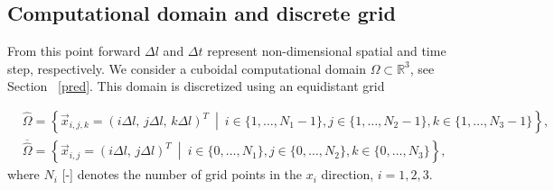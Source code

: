 \subsection{Computational domain and discrete grid}
From this point forward $ \Delta l $ and $ \Delta t $ represent non-dimensional spatial and time step, respectively. We consider a cuboidal computational domain $ \Omega \subset \mathbb{R}^3 $, see Section~ \ref{pred}. This domain is discretized using an equidistant grid

\begin{subequations}\label{eq:domain}
	\begin{eqnarray}
		&\hat{\Omega} = \left\{ \vec{x}_{i,j,k} = (i \Delta l,\,j \Delta l, \,k \Delta l)^T \ \middle| \ i \in \{1, \dots, N_{1} - 1\}, j \in \{1, \dots, N_{2} - 1 \}, k \in \{1, \dots, N_{3} - 1 \} \right\},\\[4pt]
		&\overline{\hat{\Omega}} = \left\{ \vec{x}_{i,j} = (i \Delta l,\,j \Delta l)^T \ \middle| \ i \in \{0, \dots, N_{1} \}, j \in \{0, \dots, N_{2} \}, k \in \{0, \dots, N_{3} \} \right\},
	\end{eqnarray}
\end{subequations}
where $ N_{i} $ [-] denotes the number of grid points in the $ x_i $ direction, $ i = 1, 2, 3 $.

